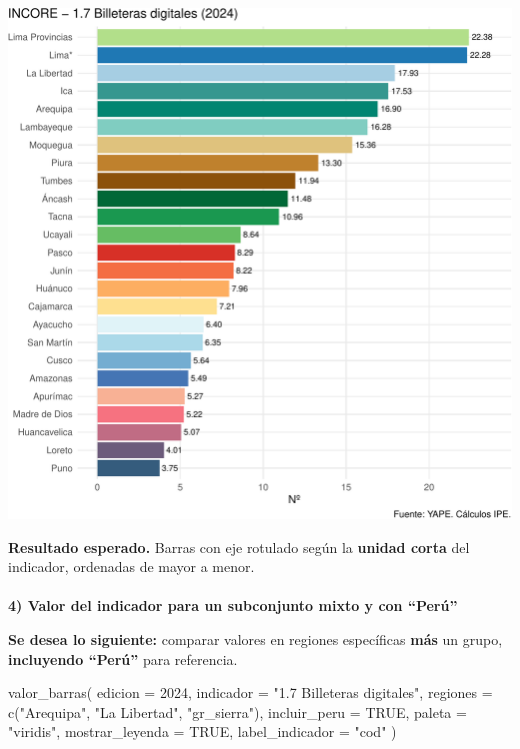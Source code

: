 \documentclass[
  11pt,
  letterpaper,
  DIV=11,
  numbers=noendperiod]{scrartcl}
\makeatletter
\let\oldparagraph\paragraph
\renewcommand{\paragraph}{
    \@ifstar
      \xxxParagraphStar
      \xxxParagraphNoStar
  }
\newcommand{\xxxParagraphStar}[1]{\oldparagraph*{#1}\mbox{}}
\newcommand{\xxxParagraphNoStar}[1]{\oldparagraph{#1}\mbox{}}
\newenvironment{Shaded}{\begin{snugshade}}{\end{snugshade}}
\newcommand{\AttributeTok}[1]{\textcolor[rgb]{0.40,0.45,0.13}{#1}}
\newcommand{\ConstantTok}[1]{\textcolor[rgb]{0.56,0.35,0.01}{#1}}
\newcommand{\DecValTok}[1]{\textcolor[rgb]{0.68,0.00,0.00}{#1}}
\newcommand{\FunctionTok}[1]{\textcolor[rgb]{0.28,0.35,0.67}{#1}}
\newcommand{\NormalTok}[1]{\textcolor[rgb]{0.00,0.23,0.31}{#1}}
\newcommand{\StringTok}[1]{\textcolor[rgb]{0.13,0.47,0.30}{#1}}
\makeatother
\begin{document}
\includegraphics{Manual_files/figure-pdf/unnamed-chunk-75-1.pdf}

\textbf{Resultado esperado.} Barras con eje rotulado según la
\textbf{unidad corta} del indicador, ordenadas de mayor a menor.

\paragraph{\texorpdfstring{\textbf{4) Valor del indicador para un
subconjunto mixto y con
``Perú''}}{4) Valor del indicador para un subconjunto mixto y con ``Perú''}}\label{valor-del-indicador-para-un-subconjunto-mixto-y-con-peruxfa}

\textbf{Se desea lo siguiente:} comparar valores en regiones específicas
\textbf{más} un grupo, \textbf{incluyendo ``Perú''} para referencia.

\begin{Shaded}
\begin{Highlighting}[]
\FunctionTok{valor\_barras}\NormalTok{(}
  \AttributeTok{edicion       =} \DecValTok{2024}\NormalTok{,}
  \AttributeTok{indicador     =} \StringTok{"1.7 Billeteras digitales"}\NormalTok{,}
  \AttributeTok{regiones      =} \FunctionTok{c}\NormalTok{(}\StringTok{"Arequipa"}\NormalTok{, }\StringTok{"La Libertad"}\NormalTok{, }\StringTok{"gr\_sierra"}\NormalTok{),}
  \AttributeTok{incluir\_peru  =} \ConstantTok{TRUE}\NormalTok{,}
  \AttributeTok{paleta        =} \StringTok{"viridis"}\NormalTok{,}
  \AttributeTok{mostrar\_leyenda =} \ConstantTok{TRUE}\NormalTok{,}
  \AttributeTok{label\_indicador =} \StringTok{"cod"}
\NormalTok{)}
\end{Highlighting}
\end{Shaded}
\end{document}
